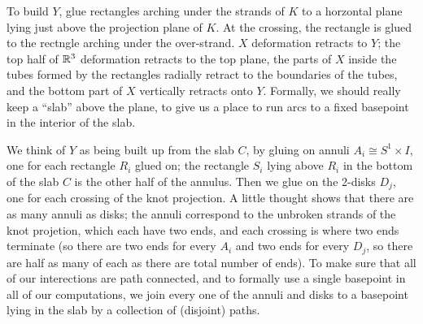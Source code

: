 \msk

\ssk


To build $Y$, glue rectangles arching under the strands of $K$ to a horzontal plane lying just above the projection plane of $K$. 
At the crossing, the rectangle is glued to the rectngle arching under the over-strand. $X$ deformation retracts to $Y$; the top half 
of ${\Bbb R}^3$ deformation retracts to the top plane, the parts of $X$ inside the tubes formed by the rectangles
radially retract to the boundaries of the tubes, and the bottom part of $X$ vertically retracts onto $Y$.
Formally, we should really keep a ``slab'' above the plane, to give us a place to run arcs to a fixed
basepoint in the interior of the slab.

\vfill
\eject

We think of $Y$ as being built up from the slab $C$, by gluing on annuli $A_i\cong S^1\times I$, one for each rectangle $R_i$ glued on;
the rectangle $S_i$ lying above $R_i$ in the bottom of the slab $C$ is the other half of the annulus. Then we glue on the 2-disks $D_j$,
one for each crossing of the knot projection. A little thought shows that there are as many annuli as disks;
the annuli correspond to the unbroken strands of the knot projetion, which each have two ends, and each crossing is where
two ends terminate (so there are two ends for every $A_i$ and two ends for every $D_j$, so there are half as
many of each as there are total number of ends). To make sure that all of our interections are path connected,
and to formally use a single basepoint in all of our computations, we join every one of the annuli and disks to a basepoint lying
in the slab by a collection of (disjoint) paths.

\msk

